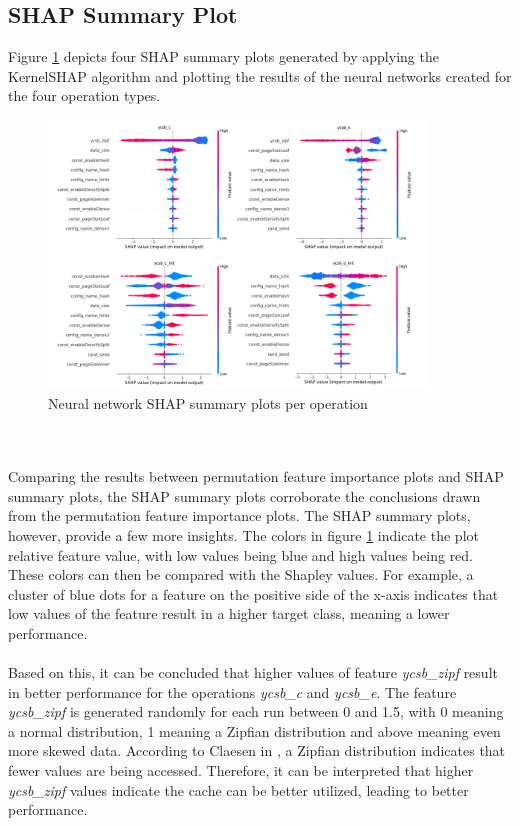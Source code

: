 \subsection{SHAP Summary Plot}
Figure \ref{fig:shap_sum} depicts four SHAP summary plots generated by applying the KernelSHAP algorithm and plotting the results of the neural networks created for the four operation types.
\begin{figure}[h]
      \centering
      \includegraphics[width=0.9\textwidth]{images/shap_sum.png}
      \caption{Neural network SHAP summary plots per operation}
      \label{fig:shap_sum}
  \end{figure}
\\\\
Comparing the results between permutation feature importance plots and SHAP summary plots, the SHAP summary plots corroborate the conclusions drawn from the permutation feature importance plots. The SHAP summary plots, however, provide a few more insights. The colors in figure \ref{fig:shap_sum} indicate the plot relative feature value, with low values being blue and high values being red. These colors can then be compared with the Shapley values. For example, a cluster of blue dots for a feature on the positive side of the x-axis indicates that low values of the feature result in a higher target class, meaning a lower performance. 
\\\\
Based on this, it can be concluded that higher values of feature \textit{ycsb\_zipf} result in better performance for the operations \textit{ycsb\_c} and \textit{ycsb\_e}. The feature \textit{ycsb\_zipf} is generated randomly for each run between 0 and 1.5, with 0 meaning a normal distribution, 1 meaning a Zipfian distribution and above meaning even more skewed data. According to Claesen in \parencite{zipfdistr}, a Zipfian distribution indicates that fewer values are being accessed. Therefore, it can be interpreted that higher \textit{ycsb\_zipf} values indicate the cache can be better utilized, leading to better performance.
